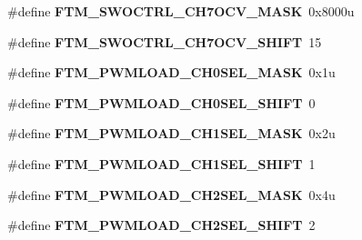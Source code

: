 \begin{DoxyCompactItemize}
\item 
\#define {\bfseries F\+T\+M\+\_\+\+S\+W\+O\+C\+T\+R\+L\+\_\+\+C\+H7\+O\+C\+V\+\_\+\+M\+A\+SK}~0x8000u\hypertarget{group__FTM__Register__Masks_gaeb2705f6572eaf6bcf1f868c8f70f6c2}{}\label{group__FTM__Register__Masks_gaeb2705f6572eaf6bcf1f868c8f70f6c2}

\item 
\#define {\bfseries F\+T\+M\+\_\+\+S\+W\+O\+C\+T\+R\+L\+\_\+\+C\+H7\+O\+C\+V\+\_\+\+S\+H\+I\+FT}~15\hypertarget{group__FTM__Register__Masks_ga6319ffea29243485dcc140b0ef64002c}{}\label{group__FTM__Register__Masks_ga6319ffea29243485dcc140b0ef64002c}

\item 
\#define {\bfseries F\+T\+M\+\_\+\+P\+W\+M\+L\+O\+A\+D\+\_\+\+C\+H0\+S\+E\+L\+\_\+\+M\+A\+SK}~0x1u\hypertarget{group__FTM__Register__Masks_ga3aed163f12371474717169636b2d9620}{}\label{group__FTM__Register__Masks_ga3aed163f12371474717169636b2d9620}

\item 
\#define {\bfseries F\+T\+M\+\_\+\+P\+W\+M\+L\+O\+A\+D\+\_\+\+C\+H0\+S\+E\+L\+\_\+\+S\+H\+I\+FT}~0\hypertarget{group__FTM__Register__Masks_ga02d773d77ba9c505275e876cd180cd79}{}\label{group__FTM__Register__Masks_ga02d773d77ba9c505275e876cd180cd79}

\item 
\#define {\bfseries F\+T\+M\+\_\+\+P\+W\+M\+L\+O\+A\+D\+\_\+\+C\+H1\+S\+E\+L\+\_\+\+M\+A\+SK}~0x2u\hypertarget{group__FTM__Register__Masks_ga01a9bbb1d2eca61c95255992a5a13e19}{}\label{group__FTM__Register__Masks_ga01a9bbb1d2eca61c95255992a5a13e19}

\item 
\#define {\bfseries F\+T\+M\+\_\+\+P\+W\+M\+L\+O\+A\+D\+\_\+\+C\+H1\+S\+E\+L\+\_\+\+S\+H\+I\+FT}~1\hypertarget{group__FTM__Register__Masks_gae4943b2c121fcb66763b08960f09bff4}{}\label{group__FTM__Register__Masks_gae4943b2c121fcb66763b08960f09bff4}

\item 
\#define {\bfseries F\+T\+M\+\_\+\+P\+W\+M\+L\+O\+A\+D\+\_\+\+C\+H2\+S\+E\+L\+\_\+\+M\+A\+SK}~0x4u\hypertarget{group__FTM__Register__Masks_gabd7f8ac1fa597d6b97b85926ae9e6fec}{}\label{group__FTM__Register__Masks_gabd7f8ac1fa597d6b97b85926ae9e6fec}

\item 
\#define {\bfseries F\+T\+M\+\_\+\+P\+W\+M\+L\+O\+A\+D\+\_\+\+C\+H2\+S\+E\+L\+\_\+\+S\+H\+I\+FT}~2\hypertarget{group__FTM__Register__Masks_ga477fae93760ebabafd41a6be108c41a1}{}\label{group__FTM__Register__Masks_ga477fae93760ebabafd41a6be108c41a1}


\end{DoxyCompactItemize}
